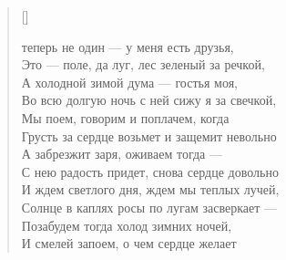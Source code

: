 \newpage
\vspace*{0cm}


\newpage
\vspace*{0cm}




\newpage
\vspace*{0cm}

\settowidth{\versewidth}{Это --- поле, да луг, лес зеленый за речкой,}
\begin{verse}[\versewidth]
\begin{patverse*}
 теперь не один --- у меня есть друзья,\\
Это --- поле, да луг, лес зеленый за речкой,\\
    А холодной зимой дума --- гостья моя,\\
Во всю долгую ночь с ней сижу я за свечкой,\\
    Мы поем, говорим и поплачем, когда\\
Грусть за сердце возьмет и защемит невольно\ldotst\\
    А забрезжит заря, оживаем тогда ---\\
С нею радость придет, снова сердце довольно\ldotst\\
    И ждем светлого дня, ждем мы теплых лучей,\\
Солнце в каплях росы по лугам засверкает ---\\
    Позабудем тогда холод зимних ночей,\\
И смелей запоем, о чем сердце желает\ldotst
\end{patverse*}
\end{verse}

\newpage
\vspace*{0cm}



